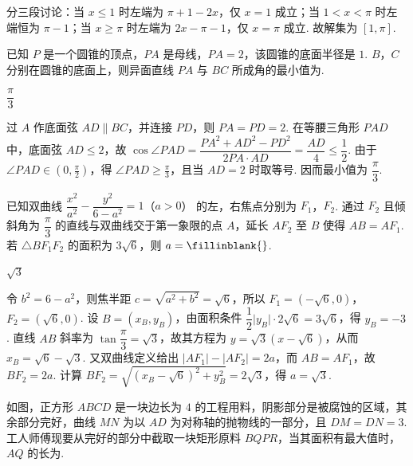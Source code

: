 \begin{solution}
分三段讨论：当 \(x\le1\) 时左端为 \(\pi+1-2x\)，仅 \(x=1\) 成立；当 \(1<x<\pi\) 时左端恒为 \(\pi-1\)；当 \(x\ge\pi\) 时左端为 \(2x-\pi-1\)，仅 \(x=\pi\) 成立. 故解集为 \([1,\pi]\).
\end{solution}

\begin{problem}
已知 \(P\) 是一个圆锥的顶点，\(PA\) 是母线，\(PA=2\)，该圆锥的底面半径是 \(1\). \(B\)，\(C\) 分别在圆锥的底面上，则异面直线 \(PA\) 与 \(BC\) 所成角的最小值为\fillinblank{}.
\end{problem}

\begin{answer}
\(\dfrac{\pi}{3}\)
\end{answer}

\begin{solution}
过 \(A\) 作底面弦 \(AD\parallel BC\)，并连接 \(PD\)，则 \(PA=PD=2\). 在等腰三角形 \(PAD\) 中，底面弦 \(AD\le2\)，故
\(\cos\angle PAD=\dfrac{PA^2+AD^2-PD^2}{2PA\cdot AD}=\dfrac{AD}{4}\le\dfrac12\).
由于 \(\angle PAD\in(0,\frac\pi2)\)，得 \(\angle PAD\ge\frac\pi3\)，且当 \(AD=2\) 时取等号. 因而最小值为 \(\dfrac\pi3\).
\end{solution}

\begin{problem}
已知双曲线 \(\dfrac{x^2}{a^2}-\dfrac{y^2}{6-a^2}=1\)（\(a>0\)） 的左，右焦点分别为 \(F_1\)，\(F_2\). 通过 \(F_2\) 且倾斜角为 \(\dfrac\pi3\) 的直线与双曲线交于第一象限的点 \(A\)，延长 \(AF_2\) 至 \(B\) 使得 \(AB=AF_1\). 若 \(\triangle BF_1F_2\) 的面积为 \(3\sqrt6\)，则 \(a=\fillinblank{}\).
\end{problem}

\begin{answer}
\(\sqrt3\)
\end{answer}

\begin{solution}
令 \(b^2=6-a^2\)，则焦半距 \(c=\sqrt{a^2+b^2}=\sqrt6\)，所以 \(F_1=(-\sqrt6,0)\)，\(F_2=(\sqrt6,0)\). 设 \(B=(x_B,y_B)\)，由面积条件
\(\dfrac12\lvert y_B\rvert\cdot2\sqrt6=3\sqrt6\)，得 \(y_B=-3\). 直线 \(AB\) 斜率为 \(\tan\dfrac\pi3=\sqrt3\)，故其方程为 \(y=\sqrt3(x-\sqrt6)\)，从而 \(x_B=\sqrt6-\sqrt3\). 又双曲线定义给出 \(\lvert AF_1\rvert-\lvert AF_2\rvert=2a\)，而 \(AB=AF_1\)，故 \(BF_2=2a\). 计算 \(BF_2=\sqrt{(x_B-\sqrt6)^2+y_B^2}=2\sqrt3\)，得 \(a=\sqrt3\).
\end{solution}

\begin{problem}
如图，正方形 \(ABCD\) 是一块边长为 \(4\) 的工程用料，阴影部分是被腐蚀的区域，其余部分完好，曲线 \(MN\) 为以 \(AD\) 为对称轴的抛物线的一部分，且 \(DM=DN=3\). 工人师傅现要从完好的部分中截取一块矩形原料 \(BQPR\)，当其面积有最大值时，\(AQ\) 的长为\fillinblank{}.

\end{problem}

